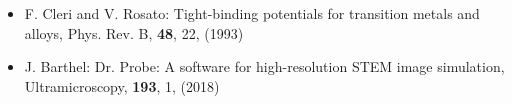  {
    \begin{itemize}
        \item[] [1] F. Cleri and V. Rosato: Tight-binding potentials for transition metals and alloys, Phys. Rev. B, \textbf{48}, 22, (1993)
        \item[] [2] J. Barthel: Dr. Probe: A software for high-resolution STEM image simulation, Ultramicroscopy, \textbf{193}, 1, (2018)
    \end{itemize}
}
